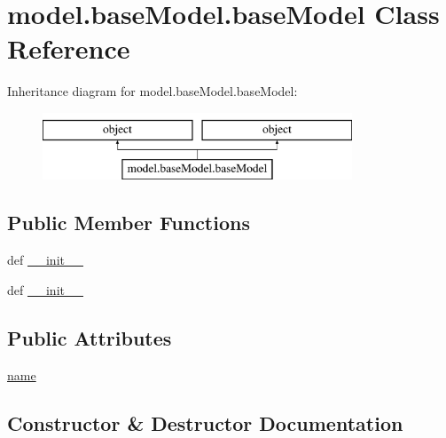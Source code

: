 \hypertarget{classmodel_1_1baseModel_1_1baseModel}{}\section{model.\+base\+Model.\+base\+Model Class Reference}
\label{classmodel_1_1baseModel_1_1baseModel}
Inheritance diagram for model.\+base\+Model.\+base\+Model\+:\begin{figure}[H]
\begin{center}
\leavevmode
\includegraphics[height=2.000000cm]{classmodel_1_1baseModel_1_1baseModel}
\end{center}
\end{figure}
\subsection*{Public Member Functions}
\begin{DoxyCompactItemize}
\item 
def \hyperlink{classmodel_1_1baseModel_1_1baseModel_ab8d48cf8c0c912c41512fa56fe899744}{\+\_\+\+\_\+init\+\_\+\+\_\+}
\item 
def \hyperlink{classmodel_1_1baseModel_1_1baseModel_ab8d48cf8c0c912c41512fa56fe899744}{\+\_\+\+\_\+init\+\_\+\+\_\+}
\end{DoxyCompactItemize}
\subsection*{Public Attributes}
\begin{DoxyCompactItemize}
\item 
\hyperlink{classmodel_1_1baseModel_1_1baseModel_aaeda64beafa1c2747373d6c4d5a3479f}{name}
\end{DoxyCompactItemize}


\subsection{Constructor \& Destructor Documentation}
\hypertarget{classmodel_1_1baseModel_1_1baseModel_ab8d48cf8c0c912c41512fa56fe899744}{}
